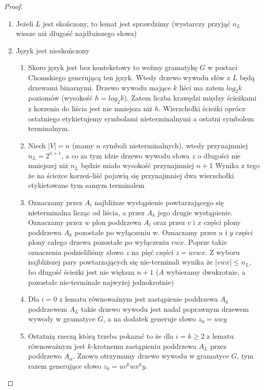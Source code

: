 \begin{lemat}
		\begin{proof}~\\
			\begin{enumerate}
				\item Jeżeli $L$ jest skończony, to lemat jest sprawdzimy (wystarczy przyjąć $n_L$ wiesze niż długość najdłuższego słowa)
				\item Język jest nieskończony
					\begin{enumerate}
						\item Skoro język jest bez kontekstowy to weźmy gramatykę $G$ w postaci Chomskiego generującą ten język. Wtedy 
						drzewo wywodu słów z $L$ będą drzewami binarnymi. Drzewo wywodu mające $k$ liści ma zatem $log_2k$ poziomów
						(wysokość $h = log_2k$). Zatem liczba krawędzi między ścieżkami z korzenia do liścia jest nie mniejsza niż $h$.
						Wierzchołki ścieżki oprócz ostatniego etykietujemy symbolami nieterminalnymi a ostatni symbolem terminalnym.
						\item Niech $|V| = n$ (mamy $n$ symboli nieterminalnych), wtedy przynajmniej $n_L = 2^{n+1}$, a co za tym 
						idzie drzewo wywodu słowa $z$ o długości nie mniejszej niż $n_L$ będzie miało wysokość przynajmniej $n+1$
						Wynika z tego że na ścieżce korzeń-liść pojawią się przynajmniej dwa wierzchołki etykietowane tym samym terminalem
						\item Oznaczamy przez $A_i$ najbliższe wystąpienie powtarzającego się nieterminalna licząc od liścia, a przez $A_k$
						jego drugie wystąpienie. Oznaczamy przez $w$ plon poddrzewa $A_l$ oraz przez $v$ i $x$ części plony poddrzewa $A_k$
						pozostałe po wyłączeniu w. Oznaczamy przez $u$ i $y$ części plony całego drzewa pozostałe po wyłączeniu $vwx$. 
						Poprze takie oznaczenia podzieliliśmy słowo $z$ na pięć części $z = uvwx$. Z wyboru najbliższej pary
						powtarzających się nie-terminali wynika że $|vwx| \leqslant n_L$, bo długość ścieżki jest nie większa $n+1$
						($A$ wybieramy dwukrotnie, a pozostałe nie-terminale najwyżej jednokrotnie)
						\item Dla $i=0$ z lematu równoważnym jest zastąpienie poddrzewa $A_k$ poddrzewem $A_L$ takie drzewo wywodu jest 
						nadal poprawnym drzewem wywody w gramatyce $G$, a na dodatek generuje słowo $z_0 = uwy$
						\item Ostatnią rzeczą którą trzeba pokazać to że dla $i = k \geqslant 2$  z lematu równoważnym jest $k$-krotnemu
						zastąpieniu poddrzewa $A_L$ przez poddrzewo $A_\alpha$. Znowu otrzymamy drzewo wywodu w gramatyce $G$, tym
						razem generujące słowo $z_k = uv^kwx^ky$.
					\end{enumerate}					 
			\end{enumerate}
		\end{proof}				
	\end{lemat}
			

